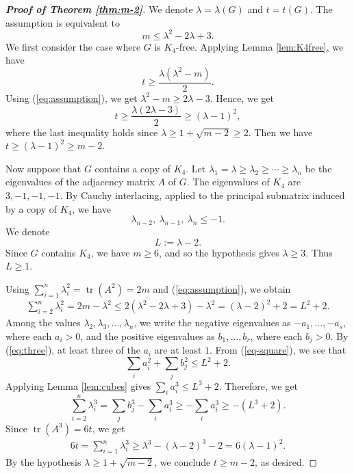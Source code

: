 \documentclass[11pt,a4paper]{article}
\theoremstyle{definition}
\theoremstyle{plain}
\newcommand{\tr}{\operatorname{tr}}
\renewcommand{\le}{\leqslant}
\renewcommand{\ge}{\geqslant}
\begin{document}
\begin{proof}[{\bf Proof of Theorem \ref{thm:m-2}}]
We denote $ \lambda=\lambda(G)$ and $t=t(G)$. 
The assumption is equivalent to 
\begin{equation} \label{eq:assumption}
        m\le \lambda^2-2\lambda+3.
\end{equation} 
We first consider the case where $G$ is $K_4$-free.  Applying Lemma
\ref{lem:K4free}, we have 
\[
        t \ge \frac{\lambda(\lambda^2-m)}{2}.
\]
Using (\ref{eq:assumption}), we get
$\lambda^2-m\ge 2\lambda-3$. 
Hence, we get 
\[
        t\ge \frac{\lambda(2\lambda-3)}{2} 
        \ge (\lambda -1)^2,
\]
where the last inequality holds since $\lambda \ge 1+ \sqrt{m-2} \ge 2$. 
Then we have $ t\ge (\lambda-1)^2\ge m-2$. 

Now suppose that $G$ contains a copy of $K_4$.  Let $ \lambda_1=\lambda\ge \lambda_2\ge \cdots\ge \lambda_n$ be the eigenvalues of the
adjacency matrix $A$ of $G$. 
The eigenvalues of $K_4$ are $3,-1,-1,-1$.  By Cauchy interlacing, applied to
the principal submatrix induced by a copy of $K_4$, we have
\begin{equation} \label{eq:three}
        \lambda_{n-2},\ \lambda_{n-1},\ \lambda_n\le -1.
\end{equation}
We denote  
\[
        L:=\lambda-2.
\]
Since $G$ contains $K_4$, we have $m\ge 6$, and so the hypothesis gives
$\lambda\ge 3$.  Thus $L\ge 1$.

Using $\sum_{i=1}^n \lambda_i^2=\tr(A^2)=2m$ and (\ref{eq:assumption}), we obtain
\begin{equation} \label{eq-square}
\begin{aligned}
        \sum_{i=2}^n\lambda_i^2
        =2m-\lambda^2                           \le 2(\lambda^2-2\lambda+3)-\lambda^2   =(\lambda-2)^2+2                        =L^2+2.
\end{aligned}
\end{equation}
Among the values $\lambda_2,\lambda_3,\ldots ,\lambda_n$, 
we write the negative eigenvalues as 
$ -a_1,\dots,-a_s$, where each $a_i>0$, 
and the positive eigenvalues as 
$ b_1,\dots,b_r$, where each $b_j>0$. 
By (\ref{eq:three}), at least three of the $a_i$ are at least $1$.  From (\ref{eq-square}), we see that  
\[
        \sum_i a_i^2+\sum_j b_j^2\le L^2+2.
\]
Applying Lemma \ref{lem:cubes} gives
$  \sum_{i} a_i^3\le L^3+2$. 
Therefore, we get 
\[
        \sum_{i=2}^n\lambda_i^3 
        =
        \sum_j b_j^3-\sum_i a_i^3
        \ge -\sum_i a_i^3 \ge 
        -(L^3+2).
\]
Since $\tr(A^3)=6t$, we get
\[
\begin{aligned}
        6t
        =\sum_{i=1}^n\lambda_i^3                \ge \lambda^3-(\lambda-2)^3-2       =6(\lambda-1)^2.
\end{aligned}
\]
By the hypothesis $\lambda \ge 1+ \sqrt{m-2}$, we conclude $ t\ge m-2$, as desired. 


\end{proof}
\end{document}
